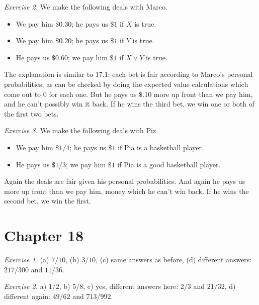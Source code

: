 \documentclass[justified]{tufte-book}
\providecommand{\tightlist}{%
  \setlength{\itemsep}{0pt}\setlength{\parskip}{0pt}}
\theoremstyle{definition}
\theoremstyle{definition}
\theoremstyle{definition}
\theoremstyle{definition}
\theoremstyle{remark}
\begin{document}
\vspace{.5em}

\noindent
\emph{Exercise 2.} We make the following deals with Marco.

\begin{itemize}
\tightlist
\item
  We pay him \(\$0.30\); he pays us \(\$1\) if \(X\) is true.
\item
  We pay him \(\$0.20\); he pays us \(\$1\) if \(Y\) is true.
\item
  He pays us \(\$0.60\); we pay him \(\$1\) if \(X \vee Y\) is true.
\end{itemize}

The explanation is similar to 17.1: each bet is fair according to Marco's personal probabilities, as can be checked by doing the expected value calculations which come out to \(0\) for each one. But he pays us \(\$.10\) more up front than we pay him, and he can't possibly win it back. If he wins the third bet, we win one or both of the first two bets.

\vspace{.5em}

\noindent
\emph{Exercise 8.} We make the following deals with Piz.

\begin{itemize}
\tightlist
\item
  We pay him \(\$1/4\); he pays us \(\$1\) if Pia is a basketball player.
\item
  He pays us \(\$1/3\); we pay him \(\$1\) if Pia is a good basketball player.
\end{itemize}

Again the deals are fair given his personal probabilities. And again he pays us more up front than we pay him, money which he can't win back. If he wins the second bet, we win the first.

\hypertarget{chapter-18}{%
\section*{Chapter 18}\label{chapter-18}}

\noindent
\emph{Exercise 1.} (a) \(7/10\), (b) \(3/10\), (c) same answers as before, (d) different answers: \(217/300\) and \(11/36\).

\vspace{.5em}

\noindent
\emph{Exercise 2.} a) \(1/2\), b) \(5/8\), c) yes, different answers here: \(2/3\) and \(21/32\), d) different again: \(49/62\) and \(713/992\).
\end{document}
